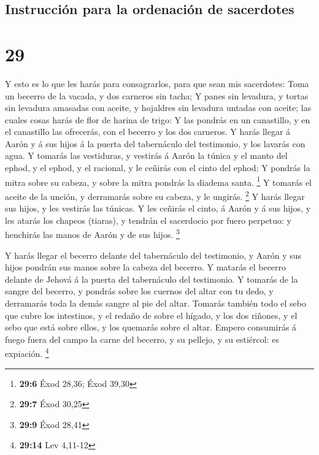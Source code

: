 \hypertarget{instrucciuxf3n-para-la-ordenaciuxf3n-de-sacerdotes}{%
\subsection{Instrucción para la ordenación de
sacerdotes}\label{instrucciuxf3n-para-la-ordenaciuxf3n-de-sacerdotes}}

\hypertarget{section-28}{%
\section{29}\label{section-28}}

 Y esto es lo que les harás para consagrarlos, para que sean
mis sacerdotes: Toma un becerro de la vacada, y dos carneros sin tacha;
 Y panes sin levadura, y tortas sin levadura amasadas con
aceite, y hojaldres sin levadura untadas con aceite; las cuales cosas
harás de flor de harina de trigo:  Y las pondrás en un
canastillo, y en el canastillo las ofrecerás, con el becerro y los dos
carneros.  Y harás llegar á Aarón y á sus hijos á la puerta
del tabernáculo del testimonio, y los lavarás con agua.  Y
tomarás las vestiduras, y vestirás á Aarón la túnica y el manto del
ephod, y el ephod, y el racional, y le ceñirás con el cinto del ephod;
 Y pondrás la mitra sobre su cabeza, y sobre la mitra
pondrás la diadema santa. \footnote{\textbf{29:6} Éxod 28,36; Éxod 39,30}
 Y tomarás el aceite de la unción, y derramarás sobre su
cabeza, y le ungirás. \footnote{\textbf{29:7} Éxod 30,25}  Y
harás llegar sus hijos, y les vestirás las túnicas.  Y les
ceñirás el cinto, á Aarón y á sus hijos, y les atarás los chapeos
(tiaras), y tendrán el sacerdocio por fuero perpetuo: y henchirás las
manos de Aarón y de sus hijos. \footnote{\textbf{29:9} Éxod 28,41}

 Y harás llegar el becerro delante del tabernáculo del
testimonio, y Aarón y sus hijos pondrán sus manos sobre la cabeza del
becerro.  Y matarás el becerro delante de Jehová á la
puerta del tabernáculo del testimonio.  Y tomarás de la
sangre del becerro, y pondrás sobre los cuernos del altar con tu dedo, y
derramarás toda la demás sangre al pie del altar.  Tomarás
también todo el sebo que cubre los intestinos, y el redaño de sobre el
hígado, y los dos riñones, y el sebo que está sobre ellos, y los
quemarás sobre el altar.  Empero consumirás á fuego fuera
del campo la carne del becerro, y su pellejo, y su estiércol: es
expiación. \footnote{\textbf{29:14} Lev 4,11-12}

